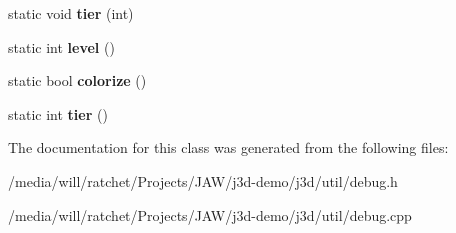 \begin{DoxyCompactItemize}
\item 
\hypertarget{classj3d_1_1util_1_1debug_a1b7e9c8c285e6966be743029a285ed9d}{}static void {\bfseries tier} (int)\label{classj3d_1_1util_1_1debug_a1b7e9c8c285e6966be743029a285ed9d}

\item 
\hypertarget{classj3d_1_1util_1_1debug_a4c0562648a49a4d282cfb0db5876a68e}{}static int {\bfseries level} ()\label{classj3d_1_1util_1_1debug_a4c0562648a49a4d282cfb0db5876a68e}

\item 
\hypertarget{classj3d_1_1util_1_1debug_afe537602d6588fffd6e3785d072e2db3}{}static bool {\bfseries colorize} ()\label{classj3d_1_1util_1_1debug_afe537602d6588fffd6e3785d072e2db3}

\item 
\hypertarget{classj3d_1_1util_1_1debug_a489d891cdb7ed59e017e7db6029d9687}{}static int {\bfseries tier} ()\label{classj3d_1_1util_1_1debug_a489d891cdb7ed59e017e7db6029d9687}

\end{DoxyCompactItemize}


The documentation for this class was generated from the following files\+:\begin{DoxyCompactItemize}
\item 
/media/will/ratchet/\+Projects/\+J\+A\+W/j3d-\/demo/j3d/util/debug.\+h\item 
/media/will/ratchet/\+Projects/\+J\+A\+W/j3d-\/demo/j3d/util/debug.\+cpp\end{DoxyCompactItemize}
